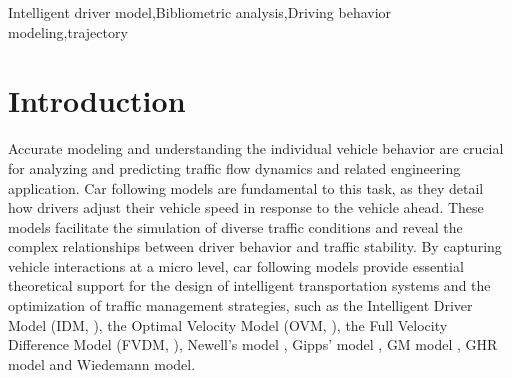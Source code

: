 \documentclass[a4paper,fleqn]{cas-sc}
\begin{document}
\begin{abstract}
The Intelligent Driver Model (IDM), proposed by \cite{treiberCongestedTrafficStatesEmpirical2000}, is recognized as a landmark in traffic flow modeling due to its simplicity and effectiveness in capturing traffic dynamics. Over the past quarter century, IDM has evolved into a foundational tool in traffic flow theory and intelligent transportation systems. Its adaptability and robustness have not only advanced the understanding of car-following behavior but also facilitated its adoption in emerging fields such as autonomous driving.This paper aims to provide a 25th anniversary bibliometric analysis of IDM-related research. A bibliometric approach is employed to identify the distribution of journal publications, influential papers, key contributors, and leading topics over the past 25 years. The literature is classified based on recurring themes, including original IDM overview, theoretical applications, practical applications, and extensions of IDM. For each theme, typical research developed to date is surveyed, and potential directions for future studies are discussed. 
\end{abstract}

\begin{keywords}
Intelligent driver model\sep Bibliometric analysis\sep Driving behavior modeling\sep trajectory
\end{keywords}

\maketitle
\section{Introduction}

Accurate modeling and understanding the individual vehicle behavior are crucial for analyzing and predicting traffic flow dynamics and related engineering application. Car following models are fundamental to this task, as they detail how drivers adjust their vehicle speed in response to the vehicle ahead. These models facilitate the simulation of diverse traffic conditions and reveal the complex relationships between driver behavior and traffic stability. By capturing vehicle interactions at a micro level, car following models provide essential theoretical support for the design of intelligent transportation systems and the optimization of traffic management strategies, such as the Intelligent Driver Model (IDM, \cite{treiberCongestedTrafficStatesEmpirical2000}), the Optimal Velocity Model (OVM, \cite{bandoDynamicalModelTrafficCongestion1995a}), the Full Velocity Difference Model (FVDM, \cite{jiangFullVelocityDifferenceModel2001a}), Newell's model \citep{newellSimplifiedCarfollowingTheoryLower2002}, Gipps' model \citep{gippsBehaviouralCarfollowingModelComputer1981a}, GM model \citep{chandlerTrafficDynamicsStudiesCar1958}, GHR model \citep{gazisNonlinearFollowLeaderModelsTraffic1961} and Wiedemann model\citep{wiedemann1992microscopic}. 
\end{document}
